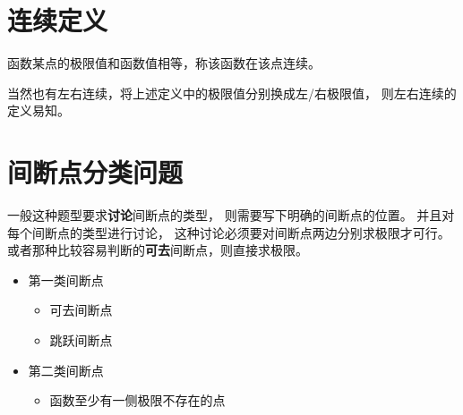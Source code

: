 \section{连续定义}

\begin{definition}
	函数某点的极限值和函数值相等，称该函数在该点连续。
\end{definition}
当然也有左右连续，将上述定义中的极限值分别换成左/右极限值，
则左右连续的定义易知。

\section{间断点分类问题}
一般这种题型要求\textbf{讨论}间断点的类型，
则需要写下明确的间断点的位置。 并且对每个间断点的类型进行讨论，
这种讨论必须要对间断点两边分别求极限才可行。
或者那种比较容易判断的\textbf{可去}间断点，则直接求极限。

\begin{itemize}
    \item 第一类间断点
        \begin{itemize} 
            \item 可去间断点
            \item 跳跃间断点
        \end{itemize}
    \item 第二类间断点
        \begin{itemize}
            \item 函数至少有一侧极限不存在的点
        \end{itemize}
\end{itemize}

